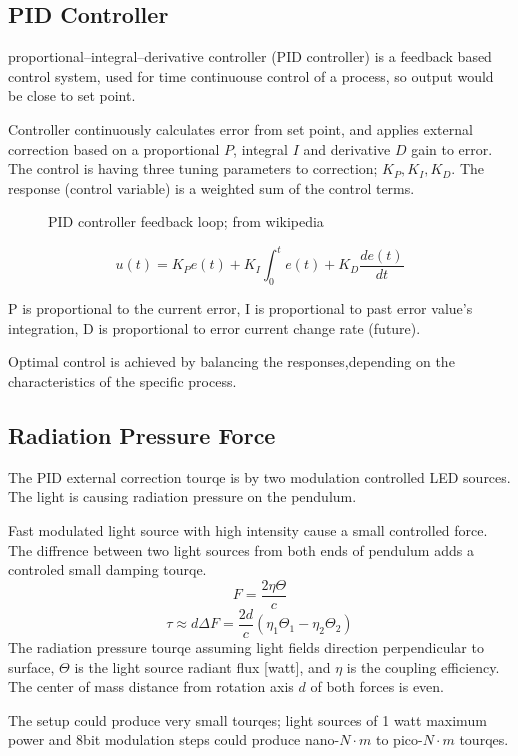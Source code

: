 \documentclass[\main/master.tex]{subfiles}
\begin{document}
\newpage
\subsection{PID Controller}
proportional–integral–derivative controller (PID controller) is a feedback based control system, used for time continuouse control of a process, so output would be close to set point.
\par
Controller continuously calculates error from set point, and applies external correction based on a proportional $P$, integral $I$ and derivative $D$ gain to error. The control is having three tuning parameters to correction; $K_P, K_I, K_D$. The response (control variable) is a weighted sum of the control terms.


\begin{figure}[htbp]
	\centering
	\caption[PID]{PID controller feedback loop; from wikipedia}
	\label{fig:PID_scheme}
\end{figure}
\begin{equation}
u(t) = K_Pe(t)+K_I\int_{0}^{t}e(t)+K_D\frac{de(t)}{dt}   \label{eqn:PID_eq}
\end{equation}

P is proportional to the current error, I is proportional to past error value's integration, D is proportional to error current change rate (future).
\par
Optimal control is achieved by balancing the responses,depending on the characteristics of the specific process. 


\newpage
\subsection{Radiation Pressure Force}
The PID external correction tourqe is by two modulation controlled LED sources. The light is causing radiation pressure on the pendulum.
\par
Fast modulated light source with high intensity cause a small controlled force. The diffrence between two light sources from both ends of pendulum adds a controled small damping tourqe. 
\begin{equation}
F = \frac{2\eta\Theta}{{c}} \label{eqn:radiation force}
\end{equation}
\begin{equation}
\tau\approx d\Delta F = \frac{2d}{{c}} (\eta_1\Theta_1 -\eta_2\Theta_2) \label{eqn:radiation tourqe}
\end{equation}
The radiation pressure tourqe assuming light fields direction perpendicular to surface, $\Theta$ is the light source radiant flux [watt], and $\eta$ is the coupling efficiency. The center of mass distance from rotation axis $d$ of both forces is even.
\par
The setup could produce very small tourqes; light sources of 1 watt maximum power and 8bit modulation steps could produce nano-$N\cdot m$ to pico-$N\cdot m$ tourqes. 
\end{document}

